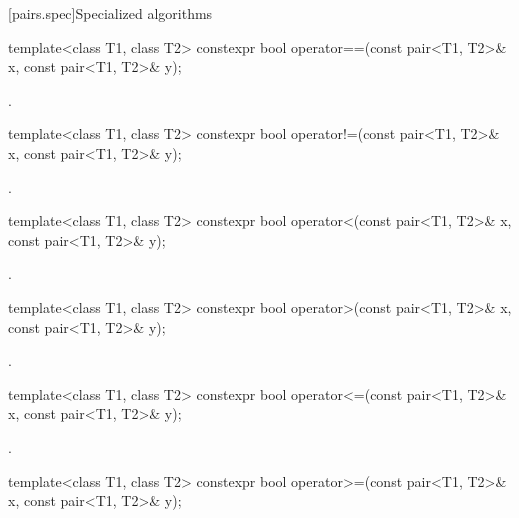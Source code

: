 [pairs.spec]{Specialized algorithms}

%
\begin{itemdecl}
template<class T1, class T2>
  constexpr bool operator==(const pair<T1, T2>& x, const pair<T1, T2>& y);
\end{itemdecl}

\begin{itemdescr}
\pnum
\returns
{}.
\end{itemdescr}

%
\begin{itemdecl}
template<class T1, class T2>
  constexpr bool operator!=(const pair<T1, T2>& x, const pair<T1, T2>& y);
\end{itemdecl}

\begin{itemdescr}
\pnum
\returns {}.
\end{itemdescr}

%
\begin{itemdecl}
template<class T1, class T2>
  constexpr bool operator<(const pair<T1, T2>& x, const pair<T1, T2>& y);
\end{itemdecl}

\begin{itemdescr}
\pnum
\returns
{}.
\end{itemdescr}

%
\begin{itemdecl}
template<class T1, class T2>
  constexpr bool operator>(const pair<T1, T2>& x, const pair<T1, T2>& y);
\end{itemdecl}

\begin{itemdescr}
\pnum
\returns {}.
\end{itemdescr}

%
\begin{itemdecl}
template<class T1, class T2>
  constexpr bool operator<=(const pair<T1, T2>& x, const pair<T1, T2>& y);
\end{itemdecl}

\begin{itemdescr}
\pnum
\returns {}.
\end{itemdescr}

%
\begin{itemdecl}
template<class T1, class T2>
  constexpr bool operator>=(const pair<T1, T2>& x, const pair<T1, T2>& y);
\end{itemdecl}

